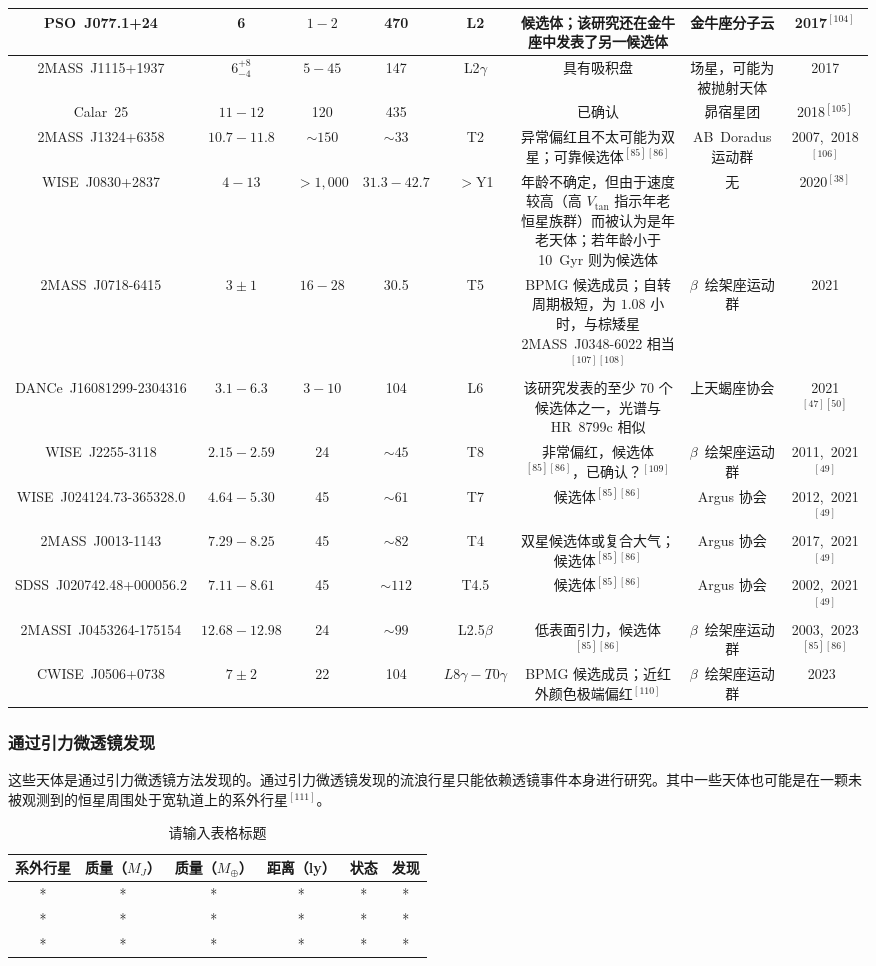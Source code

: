 \begin{table}[ht]
\begin{tabular}{|c|c|c|c|c|c|c|c|}
\hline
PSO~J077.1+24 & 6 & $1-2$ & 470 & L2 & 候选体；该研究还在金牛座中发表了另一候选体 & 金牛座分子云 & 2017$^{[104]}$\\
\hline
2MASS~J1115+1937 & $6^{+8}_{-4}$ & $5-45$ & 147  & L2$\gamma$ & 具有吸积盘  & 场星，可能为被抛射天体 & 2017\\
\hline
Calar~25 & $11-12$ & 120 & 435  &  & 已确认 & 昴宿星团 & 2018$^{[105]}$\\ 
\hline
2MASS~J1324+6358 & $10.7-11.8$ & $\sim150$ & $\sim33$ & T2 & 异常偏红且不太可能为双星；可靠候选体$^{[85][86]}$ & AB~Doradus 运动群 & 2007,~2018$^{[106]}$\\
\hline
WISE~J0830+2837 & $4-13$ & $>1{,}000$ & $31.3-42.7$ & $>$Y1 & 年龄不确定，但由于速度较高（高 $V_{\mathrm{tan}}$ 指示年老恒星族群）而被认为是年老天体；若年龄小于 10~Gyr 则为候选体 & 无 & 2020$^{[38]}$\\
\hline
2MASS~J0718-6415 & $3\pm1$ & $16-28$ & 30.5 & T5 & BPMG 候选成员；自转周期极短，为 $1.08$ 小时，与棕矮星 2MASS~J0348-6022 相当$^{[107][108]}$ & $\beta$~绘架座运动群 & 2021\\
\hline
DANCe~J16081299-2304316 & $3.1-6.3$ & $3-10$ & 104 & L6 & 该研究发表的至少 70 个候选体之一，光谱与 HR~8799c 相似 & 上天蝎座协会 & 2021$^{[47][50]}$\\
\hline
WISE~J2255-3118 & $2.15-2.59$ & 24 & $\sim45$ & T8 & 非常偏红，候选体$^{[85][86]}$，已确认？$^{[109]}$ & $\beta$~绘架座运动群 & 2011,~2021$^{[49]}$\\
\hline
WISE~J024124.73-365328.0 & $4.64-5.30$ & 45 & $\sim61$ & T7 & 候选体$^{[85][86]}$ & Argus 协会 & 2012,~2021$^{[49]}$\\
\hline
2MASS~J0013-1143 & $7.29-8.25$ & 45 & $\sim82$ & T4 & 双星候选体或复合大气；候选体$^{[85][86]}$ & Argus 协会 & 2017,~2021$^{[49]}$\\
\hline
SDSS~J020742.48+000056.2 & $7.11-8.61$ & 45 & $\sim112$ & T4.5 & 候选体$^{[85][86]}$ & Argus 协会 & 2002,~2021$^{[49]}$\\
\hline
2MASSI~J0453264-175154 & $12.68-12.98$ & 24 & $\sim99$ & L2.5$\beta$ & 低表面引力，候选体$^{[85][86]}$ & $\beta$~绘架座运动群 & 2003,~2023$^{[85][86]}$\\
\hline
CWISE~J0506+0738 & $7\pm2$ & 22 & 104 & $L8\gamma-T0\gamma$ & BPMG 候选成员；近红外颜色极端偏红$^{[110]}$ & $\beta$~绘架座运动群 & 2023\
\hline
\end{tabular}
\end{table}
\subsubsection{通过引力微透镜发现}
这些天体是通过引力微透镜方法发现的。通过引力微透镜发现的流浪行星只能依赖透镜事件本身进行研究。其中一些天体也可能是在一颗未被观测到的恒星周围处于宽轨道上的系外行星$^{[111]}$。

\begin{table}[ht]
\centering
\caption{请输入表格标题}\label{tab_RoPl2}
\begin{tabular}{|c|c|c|c|c|c|}
\hline
系外行星} & 质量（$M_J$）& 质量（$M_\oplus$） &距离（ly）& 状态 & 发现\\
\hline
* & * & * & * & * & * \\
\hline
* & * & * & * & * & * \\
\hline
* & * & * & * & * & * \\
\hline
\end{tabular}
\end{table}
